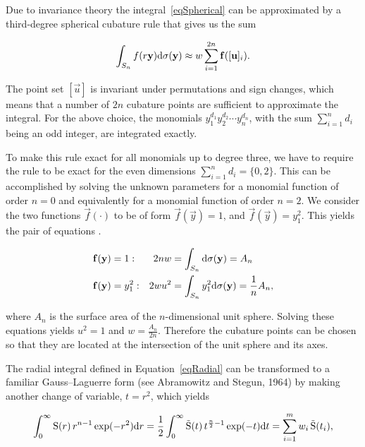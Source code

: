 Due to invariance theory \citep{Cools:1997} the integral~\eqref{eqSpherical} can be approximated by a third-degree spherical cubature rule that gives us the sum

\begin{equation} \label{eqSphericalSum}
    \int_{S_n} f(r\mathbf{y}) \mathrm{d}\sigma(\mathbf{y}) \approx w \sum_{i=1}^{2n}\mathbf{f}([\mathbf{u}]_i).
\end{equation}

\noindent%
The point set $[\vec{u}]$ is invariant under permutations and sign changes, which means that a number of $2n$ cubature points are sufficient to approximate the integral. For the above choice, the monomials $y_1^{d_1}y_2^{d_2}\cdots y_n^{d_n}$, with the sum $\sum_{i=1}^n d_i$ being an odd integer, are integrated exactly.

To make this rule exact for all monomials up to degree three, we have to require the rule to be exact for the even dimensions $\sum_{i=1}^n d_i = \{0,2\}$. This can be accomplished by solving the unknown parameters for a monomial function of order $n=0$ and equivalently for a monomial function of order $n=2$. We consider the two functions $\vec{f}(\cdot)$ to be of form $\vec{f}(\vec{y})=1$, and $\vec{f}(\vec{y})=y_1^2$. This yields the pair of equations \citep{Arasaratnam:2009}.

\begin{align*}
    \mathbf{f}(\mathbf{y})&=1 :& 2nw &= \int_{S_n} \mathrm{d}\sigma(\mathbf{y}) = A_n \\
    \mathbf{f}(\mathbf{y})&=y_1^2 :& 2wu^2 &= \int_{S_n} y_1^2 \mathrm{d}\sigma(\mathbf{y}) = \frac{1}{n} A_n,
\end{align*}

\noindent%
where $A_n$ is the surface area of the $n$-dimensional unit sphere. Solving these equations yields $u^2 = 1$ and $w = \frac{A_n}{2n}$. Therefore the cubature points can be chosen so that they are located at the intersection of the unit sphere and its axes.







The radial integral defined in Equation~\eqref{eqRadial} can be transformed to a familiar Gauss--Laguerre form (see Abramowitz and Stegun, 1964) by making another change of variable, $t=r^2$, which yields

\begin{equation} \label{eqRadialChange}
    \int_0^\infty \operatorname{S}(r) \, r^{n-1} \exp(-r^2) \mathrm{d} r = 
    {1 \over 2} \int_0^\infty \operatorname{\tilde{S}}(t) \, t^{{n \over 2}-1} \exp(-t) \mathrm{d} t = \sum_{i=1}^m w_i \operatorname{\tilde{S}}(t_i),
\end{equation}

